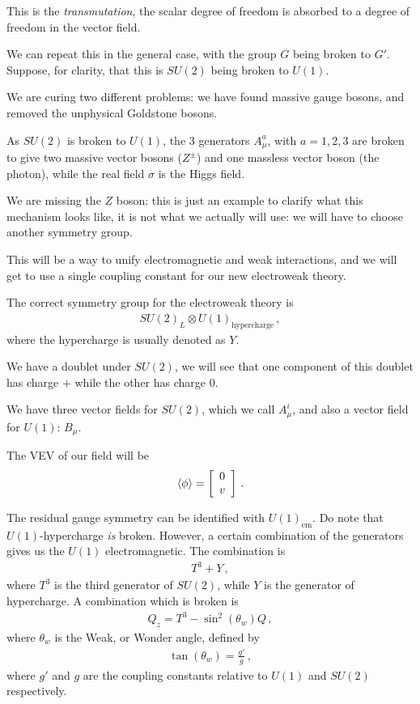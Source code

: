 \documentclass[main.tex]{subfiles}
\begin{document}
This is the \emph{transmutation}, the scalar degree of freedom is absorbed to a degree of freedom in the vector field.

We can repeat this in the general case, with the group \(G\) being broken to \(G'\). Suppose, for clarity, that this is \(SU(2)\) being broken to \(U(1)\). 

We are curing two different problems: we have found massive gauge bosons, and removed the unphysical Goldstone bosons.

As \(SU(2)\) is broken to \(U(1)\), the 3 generators \(A_{\mu }^{a}\), with \(a = 1, 2, 3\) are broken to give two massive vector bosons (\(Z^{\pm}\)) and one massless vector boson (the photon), while the real field \(\sigma \) is the Higgs field.

We are missing the \(Z\) boson: this is just an example to clarify what this mechanism looks like, it is not what we actually will use: we will have to choose another symmetry group.

This will be a way to unify electromagnetic and weak interactions, and we will get to use a single coupling constant for our new electroweak theory.

The correct symmetry group for the electroweak theory is 
%
\begin{align}
SU(2)_{L} \otimes U(1) _{\text{hypercharge}}
\,,
\end{align}
%
where the hypercharge is usually denoted as \(Y\).

We have a doublet under \(SU(2)\), we will see that one component of this doublet has charge \(+\) while the other has charge 0.

We have three vector fields for \(SU(2)\), which we call \(A_{\mu}^{i}\), and also a vector field for \(U(1)\): \(B_{\mu }\).

The VEV of our field will be 
%
\begin{subequations}
\begin{align}
\expval{\phi }= \left[\begin{array}{c}
0 \\ 
v
\end{array}\right]
\,.
\end{align}
\end{subequations}

The residual gauge symmetry can be identified with \(U(1)_{\text{em}}\). Do note that \(U(1)\)-hypercharge \emph{is} broken. However, a certain combination of the generators gives us the \(U(1)\) electromagnetic.
The combination is 
%
\begin{align}
T^{3} + Y
\,,
\end{align}
%
where \(T^{3}\) is the third generator of \(SU(2)\), while \(Y\) is the generator of hypercharge. 
A combination which is broken is 
%
\begin{align}
Q_{z} = T^{3} - \sin^2 (\theta_{w}) Q
\,,
\end{align}
%
where \(\theta_{w}\) is the Weak, or Wonder angle, defined by 
%
\begin{align}
\tan(\theta_{w}) = \frac{g'}{g}
\,,
\end{align}
%
where \(g'\) and \(g\) are the coupling constants relative to \(U(1)\) and \(SU(2)\) respectively.
\end{document}
